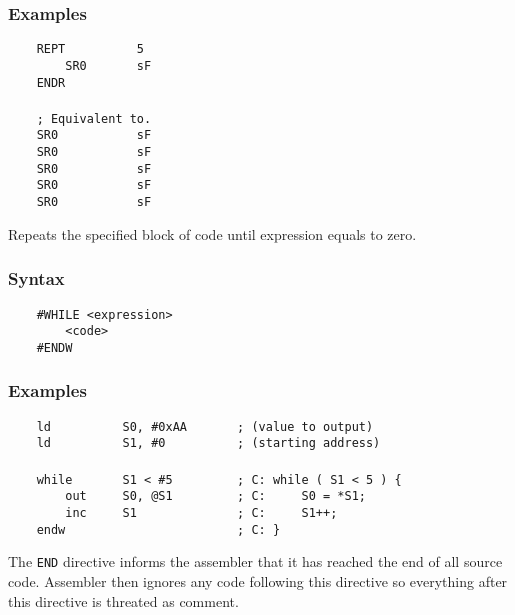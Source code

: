     \subsubsection{Examples}
        \verb'    REPT          5'\\
        \verb'        SR0       sF'\\
        \verb'    ENDR'\\
        \verb''\\
        \verb'    ; Equivalent to.'\\
        \verb'    SR0           sF'\\
        \verb'    SR0           sF'\\
        \verb'    SR0           sF'\\
        \verb'    SR0           sF'\\
        \verb'    SR0           sF'

    Repeats the specified block of code until expression equals to zero.

    \subsubsection{Syntax}
        \verb'    #WHILE <expression>'\\
        \verb'        <code>'\\
        \verb'    #ENDW'

    \subsubsection{Examples}
        \verb'    ld          S0, #0xAA       ; (value to output)'\\
        \verb'    ld          S1, #0          ; (starting address)'\\
        \verb''\\
        \verb'    while       S1 < #5         ; C: while ( S1 < 5 ) {'\\
        \verb'        out     S0, @S1         ; C:     S0 = *S1;'\\
        \verb'        inc     S1              ; C:     S1++;'\\
        \verb'    endw                        ; C: }'

    The \texttt{END} directive informs the assembler that it has reached the end of all source code. Assembler then ignores any code following this directive so everything after this directive is threated as comment.

